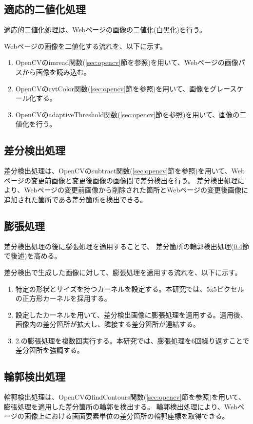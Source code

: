 \subsection{適応的二値化処理}\label{subsec:Adaptive_Binarisation}
適応的二値化処理は、Webページの画像の二値化(白黒化)を行う。
\par
Webページの画像を二値化する流れを、以下に示す。
\begin{enumerate}
    \item OpenCVのimread関数(\ref{sec:opencv}節を参照)を用いて、Webページの画像パスから画像を読み込む。
    \item OpenCVのcvtColor関数(\ref{sec:opencv}節を参照)を用いて、画像をグレースケール化する。
    \item OpenCVのadaptiveThreshold関数(\ref{sec:opencv}節を参照)を用いて、画像の二値化を行う。
\end{enumerate}

\subsection{差分検出処理}\label{subsec:difference_detection_process}
差分検出処理は、OpenCVのsubtract関数(\ref{sec:opencv}節を参照)を用いて、Webページの変更前画像と変更後画像の画像間で差分検出を行う。
差分検出処理により、Webページの変更前画像から削除された箇所とWebページの変更後画像に追加された箇所である差分箇所を検出できる。

\subsection{膨張処理}\label{subsec:dilation}
差分検出処理の後に膨張処理を適用することで、
差分箇所の輪郭検出処理(\ref{subsec:contour_detection_processing}節で後述)を高める。
\par
差分検出で生成した画像に対して、膨張処理を適用する流れを、以下に示す。
\begin{enumerate}
    \item 特定の形状とサイズを持つカーネルを設定する。本研究では、5x5ピクセルの正方形カーネルを採用する。
    \item 設定したカーネルを用いて、差分検出画像に膨張処理を適用する。適用後、画像内の差分箇所が拡大し、隣接する差分箇所が連結する。
    \item 2.の膨張処理を複数回実行する。本研究では、膨張処理を6回繰り返すことで差分箇所を強調する。
\end{enumerate}

\subsection{輪郭検出処理}\label{subsec:contour_detection_processing}
輪郭検出処理は、OpenCVのfindContours関数(\ref{sec:opencv}節を参照)を用いて、膨張処理を適用した差分箇所の輪郭を検出する。
輪郭検出処理により、Webページの画像上における画面要素単位の差分箇所の輪郭座標を取得できる。

